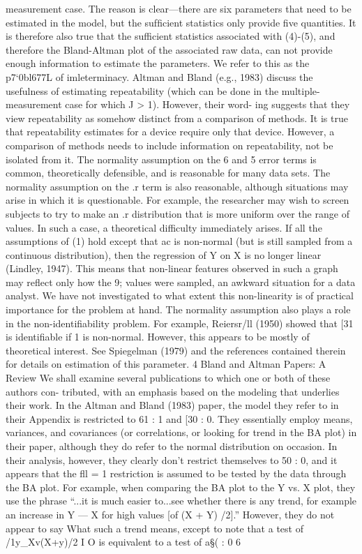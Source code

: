 measurement case. The reason is clear—there are six parameters that need to be
estimated in the model, but the sufﬁcient statistics only provide ﬁve quantities. It is
therefore also true that the sufficient statistics associated with (4)-(5), and therefore
the Bland-Altman plot of the associated raw data, can not provide enough information
to estimate the parameters. We refer to this as the p7‘0bl677L of imleterminacy. Altman
and Bland (e.g., 1983) discuss the usefulness of estimating repeatability (which can
be done in the multiple-measurement case for which J > 1). However, their word-
ing suggests that they view repeatability as somehow distinct from a comparison of
methods. It is true that repeatability estimates for a device require only that device.
However, a comparison of methods needs to include information on repeatability, not
be isolated from it.
The normality assumption on the 6 and 5 error terms is common, theoretically
defensible, and is reasonable for many data sets. The normality assumption on the .r
term is also reasonable, although situations may arise in which it is questionable. For
example, the researcher may wish to screen subjects to try to make an .r distribution
that is more uniform over the range of values. In such a case, a theoretical difficulty
immediately arises. If all the assumptions of (1) hold except that ac is non-normal
(but is still sampled from a continuous distribution), then the regression of Y on X
is no longer linear (Lindley, 1947). This means that non-linear features observed in
such a graph may reflect only how the 9; values were sampled, an awkward situation
for a data analyst. We have not investigated to what extent this non-linearity is of
practical importance for the problem at hand.
The normality assumption also plays a role in the non-identiﬁability problem. For
example, Reiersr/ll (1950) showed that [31 is identiﬁable if 1 is non-normal. However,
this appears to be mostly of theoretical interest. See Spiegelman (1979) and the
references contained therein for details on estimation of this parameter.
4 Bland and Altman Papers: A Review
We shall examine several publications to which one or both of these authors con-
tributed, with an emphasis based on the modeling that underlies their work.
In the Altman and Bland (1983) paper, the model they refer to in their Appendix
is restricted to 61 : 1 and [30 : 0. They essentially employ means, variances, and
covariances (or correlations, or looking for trend in the BA plot) in their paper,
although they do refer to the normal distribution on occasion. In their analysis,
however, they clearly don’t restrict themselves to 50 : 0, and it appears that the
ﬂl = 1 restriction is assumed to be tested by the data through the BA plot. For
example, when comparing the BA plot to the Y vs. X plot, they use the phrase “...it
is much easier to...see whether there is any trend, for example an increase in Y — X
for high values [of (X + Y) /2].” However, they do not appear to say What such a
trend means, except to note that a test of /1y_Xv(X+y)/2 I O is equivalent to a test of
a§( : 0%
6



